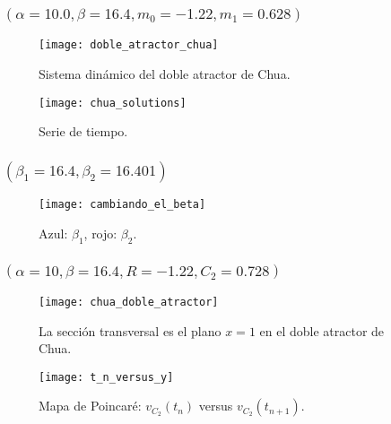 \begin{frame}
	\frametitle{\secname\quad$\left(\alpha=10.0, \beta=16.4, m_{0}=-1.22, m_{1}=0.628\right)$}

	\begin{minipage}{0.45\textwidth}
		\begin{figure}[ht!]
			\centering
			\texttt{[image: doble\_atractor\_chua]}
			\caption{Sistema dinámico del doble atractor de Chua.}\label{fig:doble_atractor_chua}
		\end{figure}
	\end{minipage}
	\begin{minipage}{0.45\textwidth}
		\begin{figure}[ht!]
			\centering
			\texttt{[image: chua\_solutions]}
			\caption{Serie de tiempo.}\label{fig:chua_solutions}
		\end{figure}
	\end{minipage}
\end{frame}

\begin{frame}
	\frametitle{\secname\quad$\left(\beta_{1}=16.4,\beta_{2}=16.401\right)$}

	\begin{figure}[ht!]
		\centering
		\texttt{[image: cambiando\_el\_beta]}
		\caption{Azul: $\beta_{1}$, rojo: $\beta_{2}$.}\label{fig:lyapunov}
	\end{figure}

\end{frame}

\begin{frame}
	\frametitle{\secname\quad$\left(\alpha=10,\beta=16.4,R=-1.22,C_{2}=0.728\right)$}

	\begin{minipage}{0.45\textwidth}
		\begin{figure}[ht!]
			\centering
			\texttt{[image: chua\_doble\_atractor]}
			\caption{La sección transversal es el plano $x=1$ en el doble atractor de Chua.}\label{fig:chua_doble_atractor}
		\end{figure}
	\end{minipage}
	\begin{minipage}{0.45\textwidth}
		\begin{figure}[ht!]
			\centering
			\texttt{[image: t\_n\_versus\_y]}
			\caption{Mapa de Poincaré: $v_{C_{2}}\left(t_{n}\right)$ versus $v_{C_{2}}\left(t_{n+1}\right)$.}\label{fig:chua_solutions}
		\end{figure}
	\end{minipage}
\end{frame}

